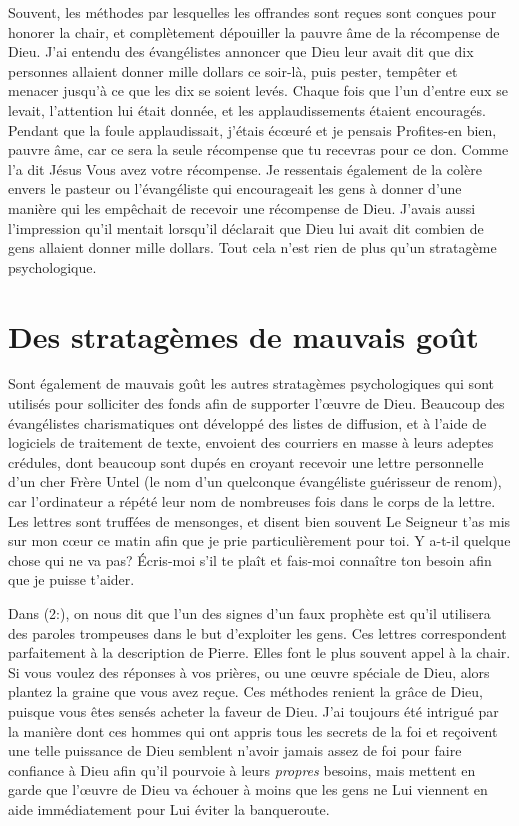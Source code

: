 Souvent, les méthodes par lesquelles les offrandes sont reçues
 sont conçues pour honorer la chair, et complètement dépouiller
 la pauvre âme de la récompense de Dieu. J'ai entendu des évangélistes
 annoncer que Dieu leur avait dit que dix personnes allaient donner
 mille dollars ce soir-là, puis pester, tempêter et menacer jusqu'à
 ce que les dix se soient levés. Chaque fois que l'un d'entre eux
 se levait, l'attention lui était donnée, et les applaudissements
 étaient encouragés. Pendant que la foule applaudissait,
 j'étais écœuré et je pensais\frcolon{} \Og Profites-en bien, pauvre âme,
 car ce sera la seule récompense que tu recevras pour ce don. \Fg{}
 Comme l'a dit Jésus\frcolon{} \Og Vous avez votre récompense. \Fg{}
 Je ressentais également de la colère envers le pasteur
 ou l'évangéliste qui encourageait les gens à donner d'une manière
 qui les empêchait de recevoir une récompense de Dieu.
 J'avais aussi l'impression qu'il mentait lorsqu'il déclarait
 que Dieu lui avait dit combien de gens allaient donner mille dollars.
 Tout cela n'est rien de plus qu'un stratagème psychologique.


\section{Des stratag\`emes de mauvais go\^ut}

Sont également de mauvais goût les autres stratagèmes psychologiques
 qui sont utilisés pour solliciter des fonds afin de supporter l'œuvre
 de Dieu. Beaucoup des évangélistes charismatiques ont développé
 des listes de diffusion, et à l'aide de logiciels de traitement
 de texte, envoient des courriers en masse à leurs adeptes crédules,
 dont beaucoup sont dupés en croyant recevoir une lettre personnelle
 d'un cher Frère Untel (le nom d'un quelconque évangéliste guérisseur
 de renom), car l'ordinateur a répété leur nom de nombreuses fois
 dans le corps de la lettre. Les lettres sont truffées de mensonges,
 et disent bien souvent\frcolon{} \Og Le Seigneur t'as mis sur mon cœur
 ce matin afin que je prie particulièrement pour toi.
 Y a-t-il quelque chose qui ne va pas? Écris-moi s'il te plaît
 et fais-moi connaître ton besoin afin que je puisse t'aider. \Fg{}

Dans (2:), on nous dit que l'un des signes
 d'un faux prophète est qu'il utilisera des paroles trompeuses
 dans le but d'ex\-ploi\-ter les gens. Ces lettres correspondent parfaitement
 à la description de Pierre. Elles font le plus souvent appel à la chair.
 Si vous voulez des réponses à vos prières, ou une œuvre spéciale de Dieu,
 alors plantez la graine que vous avez reçue.
 Ces méthodes renient la grâce de Dieu, puisque vous êtes sensés acheter
 la faveur de Dieu. J'ai toujours été intrigué par la manière dont
 ces hommes qui ont appris tous les secrets de la foi
 et reçoivent une telle puissance de Dieu semblent n'avoir jamais assez
 de foi pour faire confiance à Dieu afin qu'il pourvoie
 à leurs \emph{propres} besoins, mais mettent en garde que l'œuvre de Dieu
 va échouer à moins que les gens ne Lui viennent en aide
 immédiatement pour Lui éviter la banqueroute.


